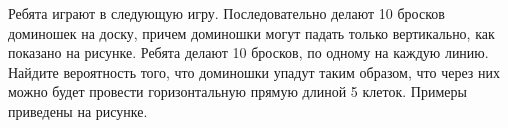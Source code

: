 
Ребята играют в следующую игру. Последовательно делают 10 бросков доминошек на доску, 
причем доминошки могут падать только вертикально, как показано на рисунке. Ребята делают 10 бросков, 
по одному на каждую линию. Найдите вероятность того, что доминошки упадут таким образом, что через них можно 
будет провести горизонтальную прямую длиной 5 клеток. Примеры приведены на рисунке.

